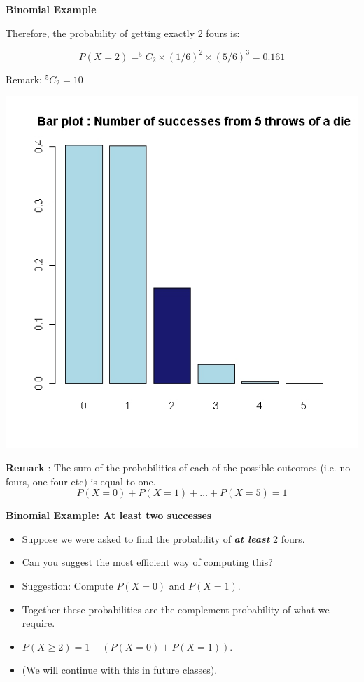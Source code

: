 \documentclass[]{report}
\begin{document}
{\textbf{Binomial Example }

Therefore, the probability of getting exactly 2 fours is:

\[P(X=2) = ^5C_2 \times (1/6)^2 \times (5/6)^3 = 0.161\]

Remark: $^5C_2 = 10$\\


\begin{center}
\includegraphics[scale=0.40]{images/3Bbarplot4}
\end{center}


\textbf{Remark} : The sum of the probabilities of each of the possible outcomes (i.e. no fours, one four etc) is equal to one.
\[P(X=0) + P(X = 1) + \ldots + P(X=5) = 1 \]



\textbf{Binomial Example: At least two successes}
\begin{itemize}
\item Suppose we were asked to find the probability of \textbf{\emph{at least}} 2 fours.
\item Can you suggest the most efficient way of computing this?
\item Suggestion: Compute $P(X=0)$ and $P(X = 1)$.
\item Together these probabilities are the complement probability of what we require.
\item $P(X \geq 2) = 1 - ( P(X=0) + P(X = 1))$.
\item (We will continue with this in future classes).
\end{itemize}

}
\end{document}
